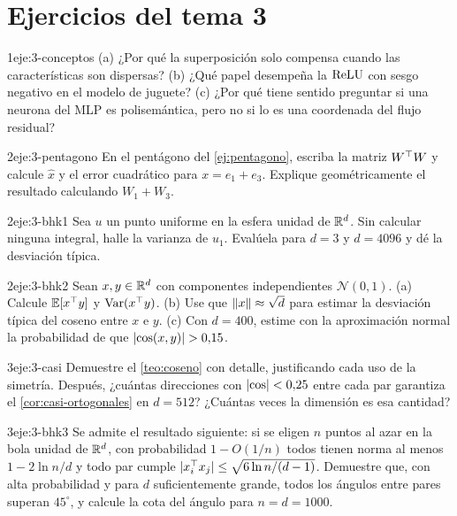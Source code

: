 \section*{Ejercicios del tema 3}

\begin{ejercicio}{1}{eje:3-conceptos}
(a) ¿Por qué la superposición solo compensa cuando las características son dispersas? (b) ¿Qué papel desempeña la $\operatorname{ReLU}$ con sesgo negativo en el modelo de juguete? (c) ¿Por qué tiene sentido preguntar si una neurona del MLP es polisemántica, pero no si lo es una coordenada del flujo residual?
\end{ejercicio}

\begin{ejercicio}{2}{eje:3-pentagono}
En el pentágono del \cref{ej:pentagono}, escriba la matriz $W^{\top} W$ y calcule $\hat x$ y el error cuadrático para $x=e_1+e_3$. Explique geométricamente el resultado calculando $W_1+W_3$.
\end{ejercicio}

\begin{ejercicio}{2}{eje:3-bhk1}
Sea $u$ un punto uniforme en la esfera unidad de $\mathbb{R}^{d}$. Sin calcular ninguna integral, halle la varianza de $u_1$. Evalúela para $d=3$ y $d=4096$ y dé la desviación típica.
\end{ejercicio}

\begin{ejercicio}{2}{eje:3-bhk2}
Sean $x,y\in\mathbb{R}^{d}$ con componentes independientes $\mathcal{N}(0,1)$. (a) Calcule $\mathbb{E}[x^{\top} y]$ y $\operatorname{Var}(x^{\top} y)$. (b) Use que $\lVert x\rVert\approx\sqrt d$ para estimar la desviación típica del coseno entre $x$ e $y$. (c) Con $d=400$, estime con la aproximación normal la probabilidad de que $\lvert\cos(x,y)\rvert>0{,}15$.
\end{ejercicio}

\begin{ejercicio}{3}{eje:3-casi}
Demuestre el \cref{teo:coseno} con detalle, justificando cada uso de la simetría. Después, ¿cuántas direcciones con $\lvert\cos\rvert<0{,}25$ entre cada par garantiza el \cref{cor:casi-ortogonales} en $d=512$? ¿Cuántas veces la dimensión es esa cantidad?
\end{ejercicio}

\begin{ejercicio}{3}{eje:3-bhk3}
Se admite el resultado siguiente: si se eligen $n$ puntos al azar en la bola unidad de $\mathbb{R}^{d}$, con probabilidad $1-O(1/n)$ todos tienen norma al menos $1-2\ln n/d$ y todo par cumple $\lvert x_i^{\top} x_j\rvert\le\sqrt{6\ln n/(d-1)}$. Demuestre que, con alta probabilidad y para $d$ suficientemente grande, todos los ángulos entre pares superan $45^\circ$, y calcule la cota del ángulo para $n=d=1000$.
\end{ejercicio}

